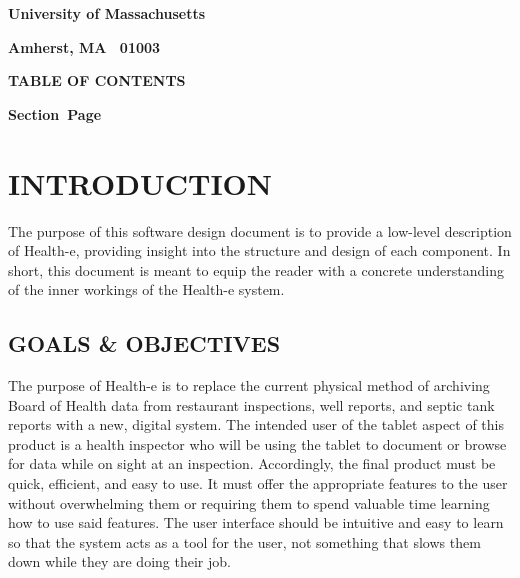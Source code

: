 \documentclass[twoside,letterpaper]{article}
\begin{document}
{\centering{}\bfseries\color{black}
University of Massachusetts
\par}

{\centering{}\bfseries\color{black}
Amherst, MA \ 01003
\par}



{\centering{}\bfseries\color{black}
TABLE OF CONTENTS
\par}


\bigskip

{\bfseries\color{black}
Section\ \hfill  Page}

\setcounter{tocdepth}{9}
\renewcommand\contentsname{}
\tableofcontents

\bigskip

\clearpage\clearpage\setcounter{page}{1}\pagestyle{Convertii}
\section[INTRODUCTION]{\rmfamily\bfseries\color{black}
INTRODUCTION}
The purpose of this software design document is to provide a low-level description of Health-e, providing insight into the structure and design of each component. In short, this document is meant to equip the reader with a concrete understanding of the inner workings of the Health-e system.

\subsection[GOALS \& OBJECTIVES]{\rmfamily\bfseries\color{black}
GOALS \& OBJECTIVES}
{\rmfamily\color{black}
The purpose of Health-e is to replace the current physical method of archiving Board of Health data from restaurant inspections, well reports, and septic tank reports with a new, digital system. The intended user of the tablet aspect of this product is a health inspector who will be using the tablet to document or browse for data while on sight at an inspection. Accordingly, the final product must be quick, efficient, and easy to use. It must offer the appropriate features to the user without overwhelming them or requiring them to spend valuable time learning how to use said features. The user interface should be intuitive and easy to learn so that the system acts as a tool for the user, not something that slows them down while they are doing their job.
}
\end{document}
